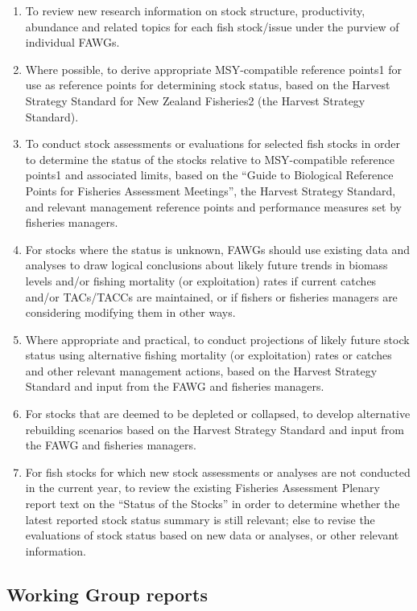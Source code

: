 \documentclass{mpi-plenary}
\theoremstyle{definition}
\theoremstyle{definition}
\theoremstyle{definition}
\theoremstyle{remark}
\begin{document}
\begin{enumerate}
\def\labelenumi{\arabic{enumi}.}
\setcounter{enumi}{2}
\item
  To review new research information on stock structure, productivity,
  abundance and related topics for each fish stock/issue under the
  purview of individual FAWGs.
\item
  Where possible, to derive appropriate MSY-compatible reference points1
  for use as reference points for determining stock status, based on the
  Harvest Strategy Standard for New Zealand Fisheries2 (the Harvest
  Strategy Standard).
\item
  To conduct stock assessments or evaluations for selected fish stocks
  in order to determine the status of the stocks relative to
  MSY-compatible reference points1 and associated limits, based on the
  ``Guide to Biological Reference Points for Fisheries Assessment
  Meetings'', the Harvest Strategy Standard, and relevant management
  reference points and performance measures set by fisheries managers.
\item
  For stocks where the status is unknown, FAWGs should use existing data
  and analyses to draw logical conclusions about likely future trends in
  biomass levels and/or fishing mortality (or exploitation) rates if
  current catches and/or TACs/TACCs are maintained, or if fishers or
  fisheries managers are considering modifying them in other ways.
\item
  Where appropriate and practical, to conduct projections of likely
  future stock status using alternative fishing mortality (or
  exploitation) rates or catches and other relevant management actions,
  based on the Harvest Strategy Standard and input from the FAWG and
  fisheries managers.
\item
  For stocks that are deemed to be depleted or collapsed, to develop
  alternative rebuilding scenarios based on the Harvest Strategy
  Standard and input from the FAWG and fisheries managers.
\item
  For fish stocks for which new stock assessments or analyses are not
  conducted in the current year, to review the existing Fisheries
  Assessment Plenary report text on the ``Status of the Stocks'' in
  order to determine whether the latest reported stock status summary is
  still relevant; else to revise the evaluations of stock status based
  on new data or analyses, or other relevant information.
\end{enumerate}

\subsection{Working Group reports}\label{working-group-reports}
\end{document}
